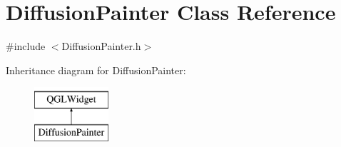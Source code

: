 \hypertarget{class_diffusion_painter}{\section{Diffusion\+Painter Class Reference}
\label{class_diffusion_painter}
}


{\ttfamily \#include $<$Diffusion\+Painter.\+h$>$}

Inheritance diagram for Diffusion\+Painter\+:\begin{figure}[H]
\begin{center}
\leavevmode
\includegraphics[height=2.000000cm]{class_diffusion_painter}
\end{center}
\end{figure}

